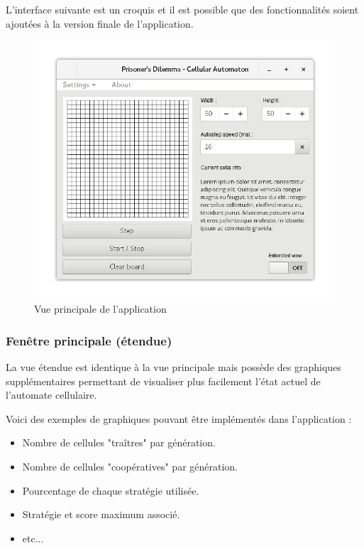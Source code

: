 \documentclass[a4paper]{article}
\begin{document}
L'interface suivante est un croquis et il est possible que des fonctionnalités soient ajoutées à la version finale de l'application.

\vfill
\begin{figure}[htp]
    \centering
    \includegraphics[width=14cm]{interface/mainview.png}
    \caption{Vue principale de l'application}
\end{figure}
\vfill

\pagebreak
\subsubsection{Fenêtre principale (étendue)}
La vue étendue est identique à la vue principale mais possède des graphiques supplémentaires permettant de visualiser plus facilement l'état actuel de l'automate cellulaire.

Voici des exemples de graphiques pouvant être implémentés dans l'application : 

\begin{itemize}
    \item Nombre de cellules "traîtres" par génération.
    \item Nombre de cellules "coopératives" par génération.
    \item Pourcentage de chaque stratégie utilisée.
    \item Stratégie et score maximum associé.
    \item etc...
\end{itemize}
\end{document}

